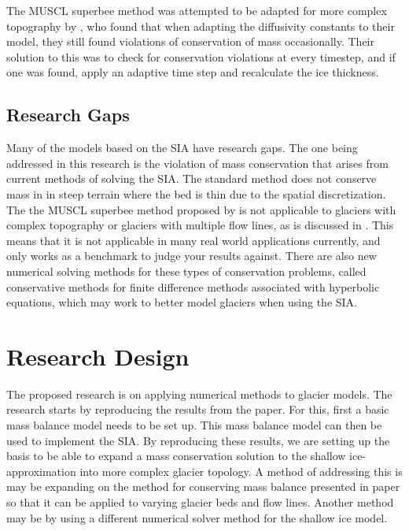 \documentclass{article}
\begin{document}
The MUSCL superbee method was attempted to be adapted for more complex topography by \citet{Clarke2015}, who found that when adapting the diffusivity constants to their model, they still found violations of conservation of mass occasionally. Their solution to this was to check for conservation violations at every timestep, and if one was found, apply an adaptive time step and recalculate the ice thickness. 



\subsection{Research Gaps}
Many of the models based on the SIA have research gaps. The one being addressed in this research is the violation of mass conservation that arises from current methods of solving the SIA. The standard method does not conserve mass in in steep terrain where the bed is thin due to the spatial discretization. The the MUSCL superbee method proposed by \citet{Jarosch2013} is not applicable to glaciers with complex topography or glaciers with multiple flow lines, as is discussed in \citet{Maussion2019}. This means that it is not applicable in many real world applications currently, and only works as a benchmark to judge your results against. There are also new numerical solving methods for these types of conservation problems, called conservative methods for finite difference methods associated with hyperbolic equations, which may work to better model glaciers when using the SIA. 




\section{Research Design}

The proposed research is on applying numerical methods to glacier models. The research starts by reproducing the results from the \citet{Jarosch2013} paper. For this, first a basic mass balance model needs to be set up. This mass balance model can then be used to implement the SIA. By reproducing these results, we are setting up the basis to be able to expand a mass conservation solution to the shallow ice-approximation into more complex glacier topology. A method of addressing this is may be expanding on the method for conserving mass balance presented in \citet{Jarosch2013} paper so that it can be applied to varying glacier beds and flow lines. Another method may be by using a different numerical solver method for the shallow ice model.
\end{document}

